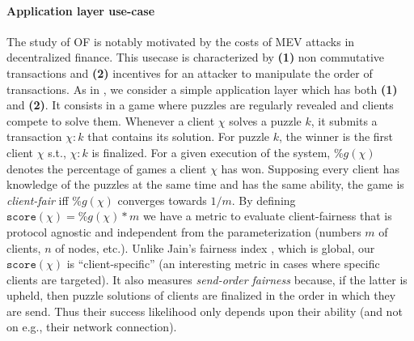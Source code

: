 \paragraph{Application layer use-case}
The study of OF is notably motivated by the costs of MEV attacks \cite{flash_boys_frontrunning_in_decentralized_exchanges_miner_extractable_value_and_consensus_instability,sok_preventing_transaction_reordering_manipulations_in_decentralized_finance} in decentralized finance.
This usecase is characterized by \textbf{(1)} non commutative transactions and \textbf{(2)} incentives for an attacker to manipulate the order of transactions.
As in \cite{adversary_augmented_simulation_to_evaluate_client_fairness_on_hyperledger_fabric}, we consider a simple application layer which has both \textbf{(1)} and \textbf{(2)}. 
It consists in a game where puzzles are regularly revealed and clients compete to solve them.
Whenever a client $\chi$ solves a puzzle $k$, it submits a transaction $\chi:k$ that contains its solution.
For puzzle $k$, the winner is the first client $\chi$ s.t., $\chi:k$ is finalized.
For a given execution of the system, \%$g(\chi)$ denotes the percentage of games a client $\chi$ has won.
Supposing every client has knowledge of the puzzles at the same time and has the same ability, the game is {\em client-fair} iff \%$g(\chi)$ converges towards $1/m$.
By defining $\mathtt{score}(\chi) = \%g(\chi) * m$ we have a metric to evaluate client-fairness that is protocol agnostic and independent from the parameterization (numbers $m$ of clients, $n$ of nodes, etc.).
Unlike Jain's fairness index \cite{a_quantitative_measure_of_fairness_and_discrimination_for_resource_allocation_in_shared_computer_systems}, which is global, our $\mathtt{score}(\chi)$ is ``client-specific'' (an interesting metric in cases where specific clients are targeted). It also measures {\em send-order fairness} because, if the latter is upheld, then puzzle solutions of clients are finalized in the order in which they are send. Thus their success likelihood only depends upon their ability (and not on e.g., their network connection).



